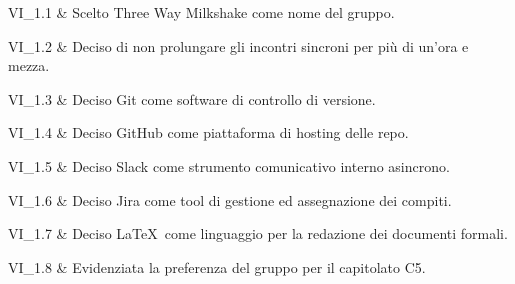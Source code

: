 VI\_1.1 & Scelto Three Way Milkshake come nome del gruppo.

\tabularnewline
VI\_1.2 & Deciso di non prolungare gli incontri sincroni per più di un'ora e mezza.

\tabularnewline
VI\_1.3 & Deciso Git come software di controllo di versione.

\tabularnewline
VI\_1.4 & Deciso GitHub come piattaforma di hosting delle repo.

\tabularnewline
VI\_1.5 & Deciso Slack come strumento comunicativo interno asincrono.

\tabularnewline
VI\_1.6 & Deciso Jira come tool di gestione ed assegnazione dei compiti.

\tabularnewline
VI\_1.7 & Deciso \LaTeX\ come linguaggio per la redazione dei documenti formali.

\tabularnewline
VI\_1.8 & Evidenziata la preferenza del gruppo per il capitolato C5.
